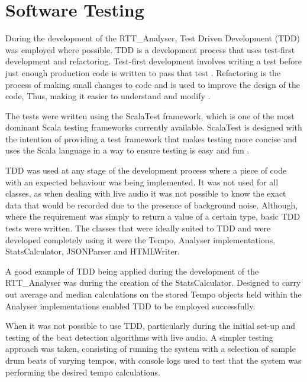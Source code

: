 \documentclass[a4paper, 11pt]{article}
\begin{document}
\maketitle{}\section{Software Testing}
During the development of the RTT\_Analyser, Test Driven Development (TDD) was employed where possible. TDD is a development process that uses test-first development and refactoring. Test-first development involves writing a test before just enough production code is written to pass that test \cite{tdd1}. Refactoring is the process of making small changes to code and is used to improve the design of the code, Thus, making it easier to understand and modify \cite{tdd2}. \par

The tests were written using the ScalaTest framework, which is one of the most dominant Scala testing frameworks currently available. ScalaTest is designed with the intention of providing a test framework that makes testing more concise and uses the Scala language in a way to ensure testing is easy and fun \cite{testingScala}.

TDD was used at any stage of the development process where a piece of code with an expected behaviour was being implemented. It was not used for all classes, as when dealing with live audio it was not possible to know the exact data that would be recorded due to the presence of background noise. Although, where the requirement was simply to return a value of a certain type, basic TDD tests were written. The classes that were ideally suited to TDD and were developed completely using it were the Tempo, Analyser implementations, StatsCalculator, JSONParser and HTMLWriter. \par

A good example of TDD being applied during the development of the RTT\_Analyser was during the creation of the StatsCalculator. Designed to carry out average and median calculations on the stored Tempo objects held within the Analyser implementations enabled TDD to be employed successfully.

When it was not possible to use TDD, particularly during the initial set-up and testing of the beat detection algorithms with live audio. A simpler testing approach was taken, consisting of running the system with a selection of sample drum beats of varying tempos, with console logs used to test that the system was performing the desired tempo calculations.
\end{document}
